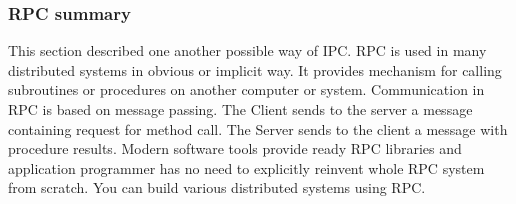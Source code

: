 \subsubsection{RPC summary}
This section described one another possible way of IPC. RPC is used in many
distributed systems in obvious or implicit way. It provides mechanism for calling 
subroutines or procedures on another computer or system. 
Communication in RPC is based on message passing.
The Client sends to the server a message containing request for method call.
The Server sends to the client a message with procedure results.
Modern software tools provide ready RPC libraries and application programmer has no need to explicitly reinvent whole RPC system from scratch.
You can build various distributed systems using RPC.
 


